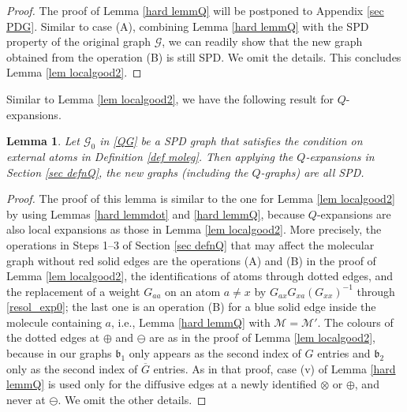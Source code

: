 \documentclass{article}
\newcommand{\1}{\mathds{1}}
\numberwithin{equation}{section}
\newcommand{\fb}{{\mathfrak b}}
\renewcommand{\cal}{\mathcal}
\newcommand{\dashed}{\text{diffusive}}
\theoremstyle{plain} %
\newtheorem{lemma}[theorem]{Lemma}
\theoremstyle{remark}
\begin{document}
\begin{proof}

The proof of Lemma \ref{hard lemmQ} will be postponed to Appendix \ref{sec PDG}. Similar to case (A), combining Lemma \ref{hard lemmQ} with the SPD property of the original graph $\cal G$, we can readily show that the new graph obtained from the operation (B) is still SPD. We omit the details. This concludes Lemma \ref{lem localgood2}.
 \end{proof}
Similar to Lemma \ref{lem localgood2}, we have the following result for $Q$-expansions.   

\begin{lemma}\label{lem localgoodQ}
Let $\cal G_0$ in \eqref{QG} be a SPD graph that satisfies the condition on external atoms in Definition \ref{def moleg}. Then applying the $Q$-expansions in Section \ref{sec defnQ}, the new graphs (including the $Q$-graphs) are all SPD.
\end{lemma}
\begin{proof}
The proof of this lemma is similar to the one for Lemma \ref{lem localgood2} by using Lemmas \ref{hard lemmdot} and \ref{hard lemmQ}, because $Q$-expansions are also local expansions as those in Lemma \ref{lem localgood2}. More precisely, the operations in Steps 1--3 of Section \ref{sec defnQ} that may affect the molecular graph without red solid edges are the operations (A) and (B) in the proof of Lemma \ref{lem localgood2}, the identifications of atoms through dotted edges, and the replacement of a weight $G_{aa}$ on an atom $a\ne x$ by $G_{ax}G_{xa}(G_{xx})^{-1}$ through \eqref{resol_exp0}; the last one is an operation (B) for a blue solid edge inside the molecule containing $a$, i.e., Lemma \ref{hard lemmQ} with $\cal M=\cal M'$. The colours of the dotted edges at $\oplus$ and $\ominus$ are as in the proof of Lemma \ref{lem localgood2}, because in our graphs $\fb_1$ only appears as the second index of $G$ entries and $\fb_2$ only as the second index of $\overline G$ entries. As in that proof, case (v) of Lemma \ref{hard lemmQ} is used only for the $\dashed$ edges at a newly identified $\otimes$ or $\oplus$, and never at $\ominus$. We omit the other details.
\end{proof}
\end{document}
